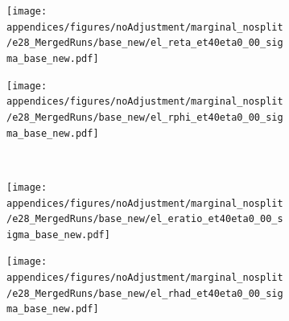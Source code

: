 \begin{figure}[b]
\begin{center}
\begin{subfigure}[c]{.48\textwidth}
\centering
\texttt{[image: appendices/figures/noAdjustment/marginal\_nosplit/e28\_MergedRuns/base\_new/el\_reta\_et40eta0\_00\_sigma\_base\_new.pdf]}
\caption{}%
\label{fig:gof_reta}
\end{subfigure}
\hfill
\begin{subfigure}[c]{.48\textwidth}
\centering
\texttt{[image: appendices/figures/noAdjustment/marginal\_nosplit/e28\_MergedRuns/base\_new/el\_rphi\_et40eta0\_00\_sigma\_base\_new.pdf]}
\caption{}%
\label{fig:gof_rphi}
\end{subfigure} \\
\begin{subfigure}[c]{.48\textwidth}
\centering
\texttt{[image: appendices/figures/noAdjustment/marginal\_nosplit/e28\_MergedRuns/base\_new/el\_eratio\_et40eta0\_00\_sigma\_base\_new.pdf]}
\caption{}%
\label{fig:gof_eratio}
\end{subfigure}
\hfill
\begin{subfigure}[c]{.48\textwidth}
\centering
\texttt{[image: appendices/figures/noAdjustment/marginal\_nosplit/e28\_MergedRuns/base\_new/el\_rhad\_et40eta0\_00\_sigma\_base\_new.pdf]}
\caption{}%
\label{fig:gof_rhad}
\end{subfigure} \\
\end{center}
\end{figure}%

